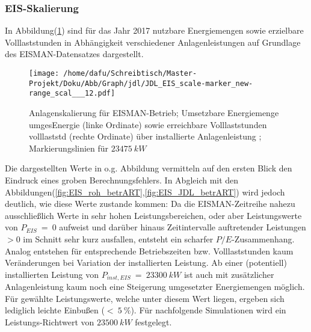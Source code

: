 \documentclass[onecolumn,10pt,titlepage]{article}
\begin{document}
\subsubsection{EIS-Skalierung}
In Abbildung(\ref{fig:Skal_EIS}) sind für das Jahr 2017 nutzbare Energiemengen sowie erzielbare Volllaststunden in Abhängigkeit verschiedener Anlagenleistungen auf Grundlage des EISMAN-Datensatzes dargestellt.
\begin{figure}[H]
	
	\centering
	\texttt{[image: /home/dafu/Schreibtisch/Master-Projekt/Doku/Abb/Graph/jdl/JDL\_EIS\_scale-marker\_new-range\_scal\_\_\_12.pdf]}
	\caption[Anlagenskalierung für EISMAN-Betrieb]{Anlagenskalierung für EISMAN-Betrieb; Umsetzbare Energiemenge \gls{umgesEnergie} (linke Ordinate) sowie erreichbare Volllaststunden \gls{volllaststd} (rechte Ordinate) über installierte Anlagenleistung ; Markierungslinien für $23475~kW$}
	\label{fig:Skal_EIS} 
\end{figure}
Die dargestellten Werte in o.g. Abbildung vermitteln auf den ersten Blick den Eindruck eines groben Berechnungsfehlers. In Abgleich mit den Abbildungen(\ref{fig:EIS_roh_betrART},\ref{fig:EIS_JDL_betrART}) wird jedoch deutlich, wie diese Werte zustande kommen: Da die EISMAN-Zeitreihe nahezu ausschließlich Werte in sehr hohen Leistungsbereichen, oder aber Leistungswerte von $P_{EIS}~=~0$ aufweist und darüber hinaus Zeitintervalle auftretender Leistungen $>0$ im Schnitt sehr kurz ausfallen, entsteht ein scharfer $P/E$-Zusammenhang. Analog entstehen für entsprechende Betriebszeiten bzw. Volllaststunden kaum Veränderungen bei Variation der installierten Leistung. Ab einer (potentiell) installierten Leistung von $P_{inst,EIS} ~=~23300~ kW$ ist auch mit zusätzlicher Anlagenleistung kaum noch eine Steigerung umgesetzter Energiemengen möglich. Für gewählte Leistungswerte, welche unter diesem Wert liegen, ergeben sich lediglich leichte Einbußen ($< ~5~\%$). Für nachfolgende Simulationen wird ein Leistungs-Richtwert von $23500~kW$ festgelegt. 
\end{document}
